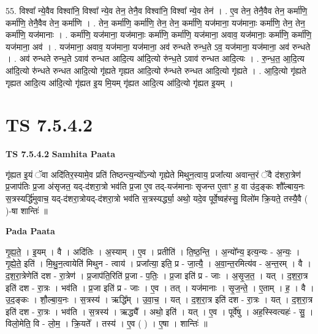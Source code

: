 \documentclass[17pt]{extarticle}
\begin{document}
55. विश्वा᳚ न्ये॒वैव विश्वा॑नि॒ विश्वा᳚ न्ये॒व तेन॒ तेनै॒व विश्वा॑नि॒ विश्वा᳚ न्ये॒व तेन॑ । . ए॒व तेन॒ तेनै॒वैव तेन॒ कर्मा॑णि॒ कर्मा॑णि॒ तेनै॒वैव तेन॒ कर्मा॑णि । . तेन॒ कर्मा॑णि॒ कर्मा॑णि॒ तेन॒ तेन॒ कर्मा॑णि॒ यज॑माना॒ यज॑मानाः॒ कर्मा॑णि॒ तेन॒ तेन॒ कर्मा॑णि॒ यज॑मानाः । . कर्मा॑णि॒ यज॑माना॒ यज॑मानाः॒ कर्मा॑णि॒ कर्मा॑णि॒ यज॑माना॒ अवाव॒ यज॑मानाः॒ कर्मा॑णि॒ कर्मा॑णि॒ यज॑माना॒ अव॑ । . यज॑माना॒ अवाव॒ यज॑माना॒ यज॑माना॒ अव॑ रुन्धते रुन्ध॒ते ऽव॒ यज॑माना॒ यज॑माना॒ अव॑ रुन्धते । . अव॑ रुन्धते रुन्ध॒ते ऽवाव॑ रुन्धत आदि॒त्य आ॑दि॒त्यो रु॑न्ध॒ते ऽवाव॑ रुन्धत आदि॒त्यः । . रु॒न्ध॒त॒ आ॒दि॒त्य आ॑दि॒त्यो रु॑न्धते रुन्धत आदि॒त्यो गृ॑ह्यते गृह्यत आदि॒त्यो रु॑न्धते रुन्धत आदि॒त्यो गृ॑ह्यते । . आ॒दि॒त्यो गृ॑ह्यते गृह्यत आदि॒त्य आ॑दि॒त्यो गृ॑ह्यत इ॒य मि॒यम् गृ॑ह्यत आदि॒त्य आ॑दि॒त्यो गृ॑ह्यत इ॒यम् । \newline
\pagebreak
{}

\section{ TS 7.5.4.2 }

\textbf{TS 7.5.4.2 } \newline
\textbf{Samhita Paata} \newline

गृ॑ह्यत इ॒यं ॅवा अदि॑तिर॒स्यामे॒व प्रति॑ तिष्ठन्त्य॒न्यो᳚ऽन्यो गृह्येते मिथुन॒त्वाय॒ प्रजा᳚त्या अवान्त॒रं ॅवै द॑शरा॒त्रेण॑ प्र॒जाप॑तिः प्र॒जा अ॑सृजत॒ यद्-द॑शरा॒त्रो भव॑ति प्र॒जा ए॒व तद्-यज॑मानाः सृजन्त ए॒ताꣳ ह॒ वा उ॑द॒ङ्कः शौ᳚ल्बाय॒नः स॒त्रस्यर्द्धि॑मुवाच॒ यद्-द॑शरा॒त्रोयद्-द॑शरा॒त्रो भव॑ति स॒त्रस्यर्द्ध्या॒ अथो॒ यदे॒व पूर्वे॒ष्वह॑स्सु॒ विलो॑म क्रि॒यते॒ तस्यै॒वै ( )-षा शान्तिः॑ ॥ \newline

\textbf{Pada Paata} \newline

गृ॒ह्य॒ते॒ । इ॒यम् । वै । अदि॑तिः । अ॒स्याम् । ए॒व । प्रतीति॑ । ति॒ष्ठ॒न्ति॒ । अ॒न्यो᳚न्य॒ इत्य॒न्यः - अ॒न्यः॒ । गृ॒ह्ये॒ते॒ इति॑ । मि॒थु॒न॒त्वायेति॑ मिथुन - त्वाय॑ । प्रजा᳚त्या॒ इति॒ प्र - जा॒त्यै॒ । अ॒वा॒न्त॒रमित्य॑व - अ॒न्त॒रम् । वै । द॒श॒रा॒त्रेणेति॑ दश - रा॒त्रेण॑ । प्र॒जाप॑ति॒रिति॑ प्र॒जा - प॒तिः॒ । प्र॒जा इति॑ प्र - जाः । अ॒सृ॒ज॒त॒ । यत् । द॒श॒रा॒त्र इति॑ दश - रा॒त्रः । भव॑ति । प्र॒जा इति॑ प्र - जाः । ए॒व । तत् । यज॑मानाः । सृ॒ज॒न्ते॒ । ए॒ताम् । ह॒ । वै । उ॒द॒ङ्कः । शौ॒ल्बा॒य॒नः । स॒त्रस्य॑ । ऋद्धि᳚म् । उ॒वा॒च॒ । यत् । द॒श॒रा॒त्र इति॑ दश - रा॒त्रः । यत् । द॒श॒रा॒त्र इति॑ दश - रा॒त्रः । भव॑ति । स॒त्रस्य॑ । ऋद्ध्यै᳚ । अथो॒ इति॑ । यत् । ए॒व । पूर्वे॑षु । अह॒स्स्वित्यहः॑ - सु॒ । विलो॒मेति॒ वि - लो॒म॒ । क्रि॒यते᳚ । तस्य॑ । ए॒व ( ) । ए॒षा । शान्तिः॑ ॥  \newline
\end{document}
